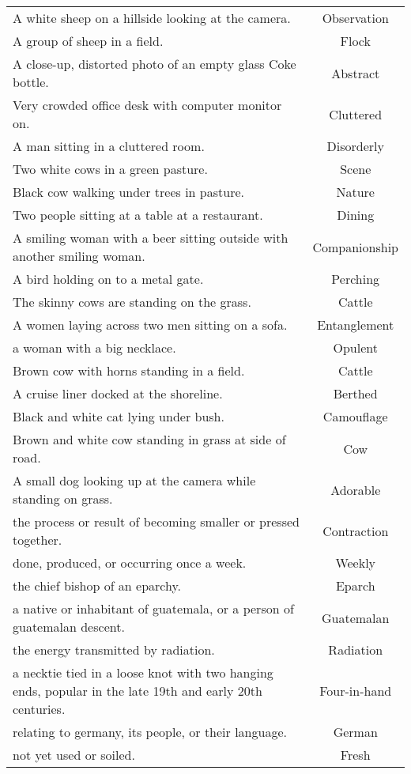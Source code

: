 \documentclass{article}
\begin{document}
\begin{longtable}{p{12cm}c}
A white sheep on a hillside looking at the camera. & Observation\\
A group of sheep in a field. & Flock\\
A close-up, distorted photo of an empty glass Coke bottle. & Abstract\\
Very crowded office desk with computer monitor on. & Cluttered\\
A man sitting in a cluttered room. & Disorderly\\
Two white cows in a green pasture. & Scene\\
Black cow walking under trees in pasture. & Nature\\
Two people sitting at a table at a restaurant. & Dining\\
A smiling woman with a beer sitting outside with another smiling woman. & Companionship\\
A bird holding on to a metal gate. & Perching\\
The skinny cows are standing on the grass. & Cattle\\
A women laying across two men sitting on a sofa. & Entanglement\\
a woman with a big necklace. & Opulent\\
Brown cow with horns standing in a field. & Cattle\\
A cruise liner docked at the shoreline. & Berthed\\
Black and white cat lying under bush. & Camouflage\\
Brown and white cow standing in grass at side of road. & Cow\\
A small dog looking up at the camera while standing on grass. & Adorable\\
the process or result of becoming smaller or pressed together. & Contraction\\
done, produced, or occurring once a week. & Weekly\\
the chief bishop of an eparchy. & Eparch\\
a native or inhabitant of guatemala, or a person of guatemalan descent. & Guatemalan\\
the energy transmitted by radiation. & Radiation\\
a necktie tied in a loose knot with two hanging ends, popular in the late 19th and early 20th centuries. & Four-in-hand\\
relating to germany, its people, or their language. & German\\
not yet used or soiled. & Fresh\\

\end{longtable}
\end{document}
